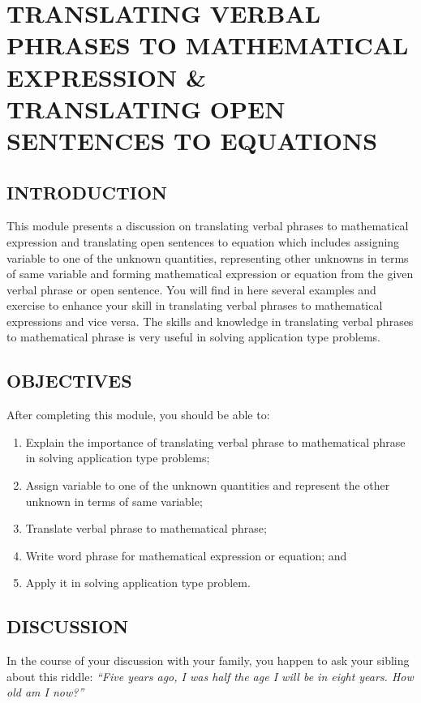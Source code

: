 \chapter[TRANSLATING: MATHEMATICAL EXPRESSIONS AND EQUATIONS]{TRANSLATING VERBAL PHRASES TO MATHEMATICAL
EXPRESSION \&\\ TRANSLATING OPEN SENTENCES TO
EQUATIONS}
\section*{INTRODUCTION}
This module presents a discussion on translating verbal phrases to mathematical expression
and translating open sentences to equation which includes assigning variable to one of the unknown
quantities, representing other unknowns in terms of same variable and forming mathematical
expression or equation from the given verbal phrase or open sentence. You will find in here several
examples and exercise to enhance your skill in translating verbal phrases to mathematical
expressions and vice versa. The skills and knowledge in translating verbal phrases to mathematical
phrase is very useful in solving application type problems.

\section*{OBJECTIVES}
After completing this module, you should be able to:
\begin{enumerate}
\item Explain the importance of translating verbal phrase to mathematical phrase in solving
application type problems;
\item Assign variable to one of the unknown quantities and represent the other unknown in terms
of same variable;
\item Translate verbal phrase to mathematical phrase;
\item Write word phrase for mathematical expression or equation; and
\item Apply it in solving application type problem.
\end{enumerate}
\section*{DISCUSSION}
In the course of your discussion with your family, you happen to ask your sibling about this riddle:
\textit{“Five years ago, I was half the age I will be in eight years. How old am I now?”}

